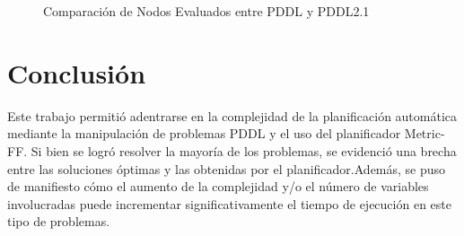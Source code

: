 \documentclass{article}
\begin{document}
\begin{figure}
    \centering
    \caption{Comparación de Nodos Evaluados entre PDDL y PDDL2.1}
    \label{fig:nodes_comparison}
\end{figure}

\newpage
\section{Conclusión}
Este trabajo permitió adentrarse en la complejidad de la planificación automática mediante la manipulación de problemas PDDL y 
el uso del planificador Metric-FF. Si bien se logró resolver la mayoría de los problemas, se evidenció una brecha entre las
 soluciones óptimas y las obtenidas por el planificador.Además, se puso de manifiesto cómo el aumento de la complejidad y/o el número de variables involucradas puede incrementar significativamente el tiempo de ejecución en este tipo de problemas.
\end{document}
